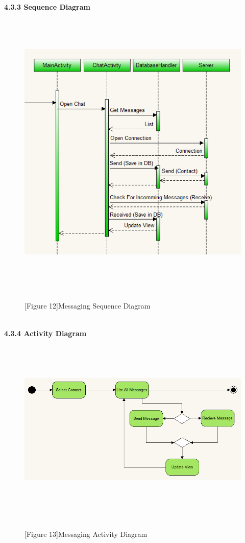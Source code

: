 \documentclass[29pt,a4paper]{moderncv}
\begin{document}
\newpage
		\textbf{4.3.3 Sequence Diagram}
			\begin{figure}
				\centering
				\\ \includegraphics[width=5.5in, height=5.0in]{./mesActivity.png}
				\\\caption{[Figure 12]Messaging Sequence Diagram}\\
			\end{figure}	
\newpage
\\
		\left\textbf{4.3.4 Activity Diagram}
			\begin{figure}
				\centering
				\\ \includegraphics[width=5.5in, height=3.0in]{./acMessaging.png}
				\\\caption{[Figure 13]Messaging Activity Diagram}\\
			\end{figure}
		
\end{document}
